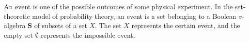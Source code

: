 An event is one of the possible outcomes of some physical experiment. In the set-theoretic model of probability theory, an event is a set belonging to a Boolean $\sigma$-algebra $\mathbf{S}$ of subsets of a set $X$. The set $X$ represents the certain event, and the empty set $\emptyset$ represents the impossible event.
